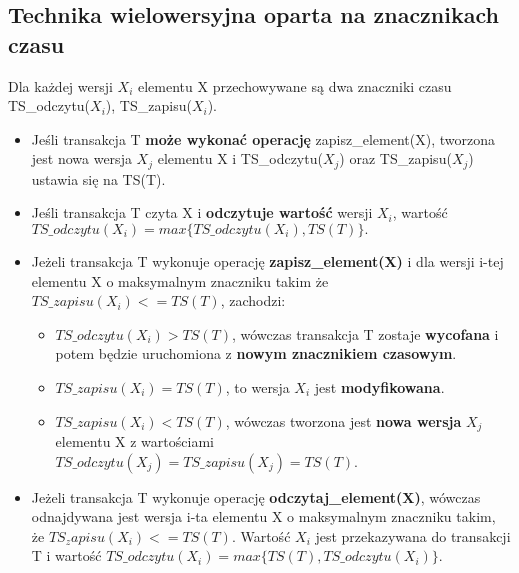 \documentclass[a4paper]{article}
\begin{document}
\subsection{Technika wielowersyjna oparta na znacznikach czasu}

Dla każdej wersji $X_i$ elementu X przechowywane są dwa znaczniki czasu TS\_odczytu($X_i$), TS\_zapisu($X_i$).

\begin{itemize}
    \item Jeśli transakcja T \textbf{może wykonać operację} zapisz\_element(X), tworzona jest nowa wersja $X_j$ elementu X i TS\_odczytu($X_j$) oraz TS\_zapisu($X_j$) ustawia się na TS(T).
    \item Jeśli transakcja T czyta X i \textbf{odczytuje wartość} wersji $X_i$, wartość $TS\_odczytu(X_i) = max \{TS\_odczytu(X_i), TS(T)\}.$
    \item Jeżeli transakcja T wykonuje operację \textbf{zapisz\_element(X)} i dla wersji i-tej elementu X o maksymalnym znaczniku takim że $TS\_zapisu(X_i) <= TS(T)$, zachodzi:
    \begin{itemize}
        \item $TS\_odczytu(X_i) > TS(T)$, wówczas transakcja T zostaje \textbf{wycofana} i potem będzie uruchomiona z \textbf{nowym znacznikiem czasowym}.
        \item $TS\_zapisu(X_i) = TS(T)$, to wersja $X_i$ jest \textbf{modyfikowana}.
        \item $TS\_zapisu(X_i) < TS(T)$, wówczas tworzona jest \textbf{nowa wersja} $X_j$ elementu X z wartościami $TS\_odczytu(X_j) = TS\_zapisu(X_j) = TS(T)$. 
    \end{itemize} 
    \item  Jeżeli transakcja T wykonuje operację \textbf{odczytaj\_element(X)}, wówczas odnajdywana jest wersja i-ta elementu X o maksymalnym znaczniku takim, że $TS_zapisu(X_i) <= TS(T)$. Wartość $X_i$ jest przekazywana do transakcji T i wartość $TS\_odczytu(X_i) = max\{TS(T), TS\_odczytu(X_i)\}$.
\end{itemize}
\end{document}
